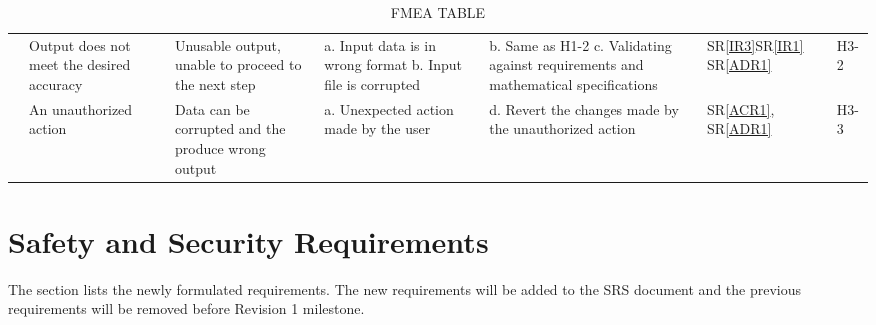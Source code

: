 \documentclass{article}
\begin{document}
\begin{landscape}
\begin{table}[H]
{\begin{tabular}{|p{1.8 in}|p{2.0 in}|p{2 in}|p{2 in}|p{2.3 in}|p{0.5 in}|p{0.5 in}|}
& Output does not meet the desired accuracy
& Unusable output, unable to proceed to the next step
&
a. Input data is in wrong format
b. Input file is corrupted
& 
b. Same as H1-2 \newline
c. Validating against requirements and mathematical specifications\newline
& SR\ref{IR3}\newline SR\ref{IR1} \newline SR\ref{ADR1}
& H3-2\label{H3-2}  \\


& An unauthorized action
& Data can be corrupted and the produce wrong output 
&
a. Unexpected action made by the user\newline
& 
d. Revert the changes made by the unauthorized action\newline
& SR\ref{ACR1}, SR\ref{ADR1}
& H3-3 \\ \hline



 

\end{tabular}
}
\caption{FMEA TABLE}
\label{Table:FMEA TABLE}
\end{table}
\end{landscape}
\section{Safety and Security Requirements}
The section lists the newly formulated requirements. The new requirements will be added to the SRS document and the previous requirements will be removed before Revision 1 milestone.
\end{document}
